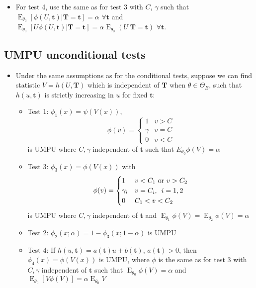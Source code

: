 \documentclass[fontsize=5pt]{scrartcl}
\DeclareMathOperator{\E}{E}
\begin{document}
\begin{multicols}{2}
\begin{itemize}
\item For test 4, use the same as for test 3 with $C$, $\gamma$ such
  that $\E_{\theta_{0}}[\phi(U,\mathbf{t})|\mathbf{T=t}]=\alpha$
  $\forall\mathbf{t}$ and
  $\E_{\theta_{0}}[U\phi(U,\mathbf{t})|\mathbf{T=t}] =
  \alpha\E_{\theta_{0}}(U|\mathbf{T=t})$ $\forall\mathbf{t}$.
\end{itemize}

\subsection{UMPU unconditional tests}

\begin{itemize}
\item Under the same assumptions as for the conditional tests, suppose
  we can find statistic $V=h(U,\mathbf{T})$ which is independent of
  $\mathbf{T}$ when $\theta\in\Theta_{B}$, such that $h(u,\mathbf{t})$
  is strictly increasing in $u$ for fixed $\mathbf{t}$:
  \begin{itemize}
  \item Test 1: $\phi_{1}(x)=\psi(V(x))$,
    \begin{equation}
      \phi(v)=\begin{cases}
        1 & v > C \\
        \gamma & v=C \\
        0 & v<C
      \end{cases}
    \end{equation}
    is UMPU where $C,\gamma$ independent of $\mathbf{t}$ such that
    $E_{\theta_{0}}\phi(V)=\alpha$
  \item Test 3: $\phi_{3}(x) = \phi(V(x))$ with
    \begin{equation}
      \phi(v) =
      \begin{cases}
        1 & v<C_{1}\text{ or }v>C_{2} \\
        \gamma_{i} & v=C_{i},\enskip i=1,2 \\
        0 & C_{1}<v<C_{2}
      \end{cases}
    \end{equation}
    is UMPU where $C,\gamma$ independent of $\mathbf{t}$ and
    $\E_{\theta_{1}}\phi(V) = \E_{\theta_{2}}\phi(V)=\alpha$
  \item Test 2: $\phi_{2}(x;\alpha) = 1-\phi_{3}(x;1-\alpha)$ is UMPU
  \item Test 4: If $h(u,\mathbf{t})=a(\mathbf{t})u + b(\mathbf{t})$,
    $a(\mathbf{t})>0$, then $\phi_{4}(x) = \phi(V(x))$ is UMPU, where
    $\phi$ is the same as for test 3 with $C,\gamma$ independent of
    $\mathbf{t}$ such that $\E_{\theta_{0}}\phi(V)=\alpha$ and
    $\E_{\theta_{0}}[V\phi(V)]=\alpha\E_{\theta_{0}}V$
  \end{itemize}

\end{itemize}


\end{multicols}
\end{document}
